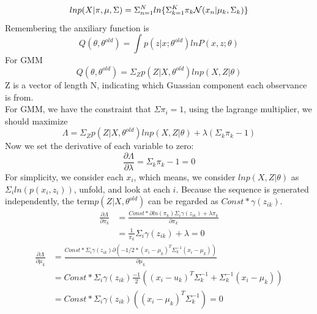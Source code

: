 \documentclass[11pt]{article}
\begin{document}
\begin{equation}{\label{maxlike}}
lnp(X|\pi,\mu,\Sigma)=\Sigma^N_{n=1}ln\{\Sigma^K_{k=1}\pi_k
\mathcal{N}(x_n|\mu_k,\Sigma_k)\}
\end{equation}
Remembering the anxiliary function is
\begin{equation}
Q(\theta, \theta^{old}) = \int p(z|x; \theta^{old}) lnP(x,z;\theta)
\end{equation}
For GMM
\begin{equation}
Q(\theta, \theta^{old}) = \Sigma_Z p(Z|X, \theta^{old}) ln p(X,Z|\theta)
\end{equation}
Z is a vector of length N, indicating which Guassian component each observance is from.\\ For GMM, we have the constraint that $\Sigma \pi_i = 1$, using the lagrange multiplier, we should maximize
\begin{equation}
\Lambda = \Sigma_Z p(Z|X, \theta^{old}) ln p(X,Z|\theta) + \lambda(\Sigma_k \pi_k - 1)
\end{equation}
Now we set the derivative of each variable to zero:
\begin{equation}
\frac{\partial \Lambda}{\partial \lambda} = \Sigma_k \pi_k -1=0
\end{equation}
For simplicity,  we consider each $x_i$, which means, we consider $lnp(X,Z|\theta)$ as $\Sigma_i ln(p(x_i,z_i))$, unfold, and look at each $i$. Because the sequence is generated independently, the term$p(Z|X,\theta^{old})$ can be regarded as $Const * \gamma(z_{ik})$.
\begin{equation}
\begin{split}
\frac{\partial \Lambda}{\partial \pi_k} &= \frac{Const* \partial ln(\pi_k)\Sigma_i\gamma(z_{ik}) + \lambda \pi_k}{\partial \pi_k}\\
&=\frac{1}{\pi_k}\Sigma_i\gamma(z_{ik})+\lambda=0
\end{split}
\end{equation}
\begin{equation}
\begin{split}
\frac{\partial \Lambda}{\partial \mu_k} &= \frac{Const* \Sigma_i \gamma(z_{ik}) \partial (-1/2 * (x_i-\mu_k)^T\Sigma_k^{-1}(x_i-\mu_k)) }{\partial \mu_k}\\
&= Const * \Sigma_i \gamma(z_{ik})\frac{-1}{2}((x_i-u_k)^T\Sigma_k^{-1}+\Sigma_k^{-1}(x_i-\mu_k))\\
&= Const * \Sigma_i \gamma(z_{ik})((x_i-\mu_k)^T\Sigma_k^{-1})=0
\end{split}
\end{equation}
\end{document}
